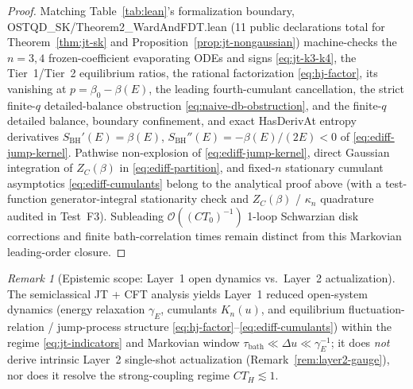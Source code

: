 \documentclass[11pt,a4paper]{article}
\theoremstyle{definition}
\theoremstyle{remark}
\newtheorem{remark}{Remark}
\newcommand{\1}{\mathbf{1}}
\newcommand{\code}[1]{{\scriptsize\ttfamily #1}}
\begin{document}
\begin{proof}
Matching Table~\ref{tab:lean}'s formalization boundary, \code{OSTQD\_\allowbreak SK/\allowbreak Theorem2\_\allowbreak WardAndFDT.lean} (11 public declarations total for Theorem~\ref{thm:jt-sk} and Proposition~\ref{prop:jt-nongaussian}) machine-checks the $n=3,4$ frozen-coefficient evaporating ODEs and signs \eqref{eq:jt-k3-k4}, the Tier~1/Tier~2 equilibrium ratios, the rational factorization \eqref{eq:hj-factor}, its vanishing at $p=\beta_0-\beta(E)$, the leading fourth-cumulant cancellation, the strict finite-$q$ detailed-balance obstruction \eqref{eq:naive-db-obstruction}, and the finite-$q$ detailed balance, boundary confinement, and exact \code{HasDerivAt} entropy derivatives $S_{\mathrm{BH}}'(E)=\beta(E)$, $S_{\mathrm{BH}}''(E)=-\beta(E)/(2E)<0$ of \eqref{eq:ediff-jump-kernel}. Pathwise non-explosion of \eqref{eq:ediff-jump-kernel}, direct Gaussian integration of $Z_C(\beta)$ in \eqref{eq:ediff-partition}, and fixed-$n$ stationary cumulant asymptotics \eqref{eq:ediff-cumulants} belong to the analytical proof above (with a test-function generator-integral stationarity check and $Z_C(\beta)$ / $\kappa_n$ quadrature audited in Test~F3). Subleading $\mathcal{O}((CT_0)^{-1})$ 1-loop Schwarzian disk corrections \cite{StanfordWitten2017} and finite bath-correlation times \cite{Gaikwad2023} remain distinct from this Markovian leading-order closure.
\end{proof}

\begin{remark}[Epistemic scope: Layer~1 open dynamics vs.\ Layer~2 actualization]\label{rem:layer12}
The semiclassical JT + CFT analysis yields Layer~1 reduced open-system dynamics (energy relaxation $\gamma_E$, cumulants $K_n(u)$, and equilibrium fluctuation-relation / jump-process structure \eqref{eq:hj-factor}--\eqref{eq:ediff-cumulants}) within the regime \eqref{eq:jt-indicators} and Markovian window $\tau_{\mathrm{bath}}\ll\Delta u\ll\gamma_E^{-1}$; it does \emph{not} derive intrinsic Layer~2 single-shot actualization (Remark~\ref{rem:layer2-gauge}), nor does it resolve the strong-coupling regime $CT_H \lesssim 1$.
\end{remark}
\end{document}
